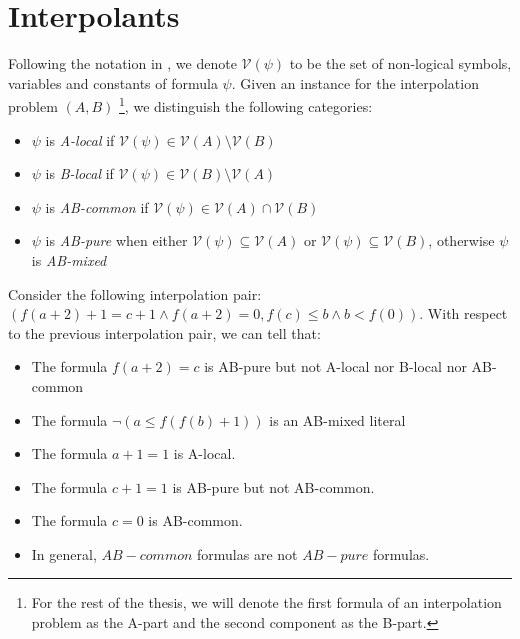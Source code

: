 \section{Interpolants}

Following the notation in \cite{10.1007/11532231_26}, we denote 
$\mathcal{V}(\psi)$ to be the set of non-logical symbols, variables
and constants of formula $\psi$. Given an instance for the interpolation
problem $(A, B)$ \footnote{For the rest of the thesis, we will denote the 
  first formula of an interpolation problem as the A-part 
and the second component as the B-part.}, 
we distinguish the following categories:

\begin{itemize}
  \item $\psi$ is \emph{A-local} if $\mathcal{V}(\psi) \in 
    \mathcal{V}(A) \setminus \mathcal{V}(B)$
  \item $\psi$ is \emph{B-local} if $\mathcal{V}(\psi) \in 
    \mathcal{V}(B) \setminus \mathcal{V}(A)$
  \item $\psi$ is \emph{AB-common} if $\mathcal{V}(\psi) \in
    \mathcal{V}(A) \cap \mathcal{V}(B)$
  \item $\psi$ is \emph{AB-pure} when either $\mathcal{V}(\psi) \subseteq 
    \mathcal{V}(A)$ or $\mathcal{V}(\psi) \subseteq \mathcal{V}(B)$, otherwise
    $\psi$ is \emph{AB-mixed}
\end{itemize}

\begin{example} \label{first_example}

  Consider the following interpolation pair: $(f(a + 2) + 1 = c + 1
    \land f(a + 2) = 0
  , f(c) \leq b \land b < f(0))$. With respect to the previous 
  interpolation pair, we can tell that:
  \begin{itemize}
    \item The formula $f(a + 2) = c$ is 
      AB-pure but not A-local nor B-local nor AB-common
    \item The formula $\neg(a \leq f(f(b) + 1))$ is an AB-mixed
      literal
    \item The formula $a + 1 = 1$ is A-local.
    \item The formula $c + 1 = 1$ is AB-pure but not AB-common.
    \item The formula $c = 0$ is AB-common.
    \item In general, $AB-common$ formulas are not $AB-pure$ formulas.
  \end{itemize}
\end{example}

